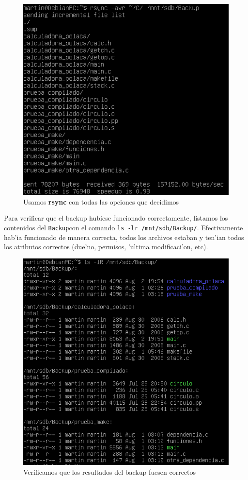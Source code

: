 \documentclass[11pt]{article}
\newcommand{\rsync}[0]{\textbf{rsync}}
\newcommand{\backup}[0]{\texttt{Backup}}
\begin{document}
		\begin{figure}[H]
			\centering
			\includegraphics[scale=0.7]{Images/rsync/rsync_backup_final.PNG}
			\caption{Usamos \rsync{} con todas las opciones que decidimos}
			\label{fig:rsync_backup_final}
		\end{figure}

		Para verificar que el backup hubiese funcionado correctamente, listamos los contenidos del \backup con el comando \texttt{ls -lr /mnt/sdb/Backup/}. Efectivamente hab'ia funcionado de manera correcta, todos los archivos estaban y ten'ian todos los atributos correctos (due'no, permisos, 'ultima modificaci'on, etc).

		\begin{figure}[H]
			\centering
			\includegraphics[scale=0.7]{Images/rsync/rsync_backup_final_result.PNG}
			\caption{Verificamos que los resultados del backup fuesen correctos}
			\label{fig:rsync_backup_final_result}
		\end{figure}
\end{document}
